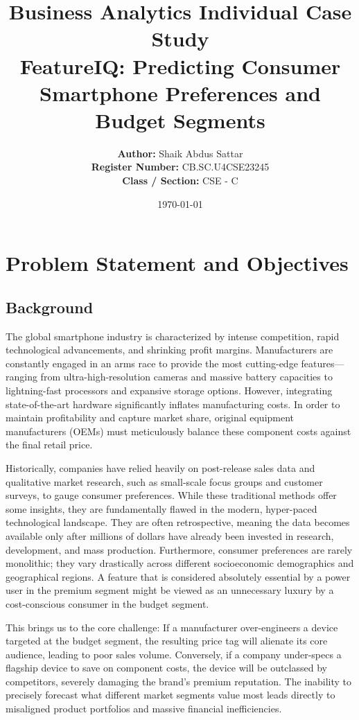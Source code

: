 \documentclass[12pt,a4paper]{article}
\title{Business Analytics Individual Case Study\\
\vspace{1cm}
\Large \textbf{FeatureIQ: Predicting Consumer Smartphone Preferences and Budget Segments}\\
\vspace{1cm}
}
\author{
    \textbf{Author:} Shaik Abdus Sattar \\
    \textbf{Register Number:} CB.SC.U4CSE23245 \\
    \textbf{Class / Section:} CSE - C
}
\date{\today}
\begin{document}
\maketitle
\thispagestyle{empty}
\newpage

\tableofcontents
\newpage

\section{Problem Statement and Objectives}

\subsection{Background}
The global smartphone industry is characterized by intense competition, rapid technological advancements, and shrinking profit margins. Manufacturers are constantly engaged in an arms race to provide the most cutting-edge features—ranging from ultra-high-resolution cameras and massive battery capacities to lightning-fast processors and expansive storage options. However, integrating state-of-the-art hardware significantly inflates manufacturing costs. In order to maintain profitability and capture market share, original equipment manufacturers (OEMs) must meticulously balance these component costs against the final retail price. 

Historically, companies have relied heavily on post-release sales data and qualitative market research, such as small-scale focus groups and customer surveys, to gauge consumer preferences. While these traditional methods offer some insights, they are fundamentally flawed in the modern, hyper-paced technological landscape. They are often retrospective, meaning the data becomes available only after millions of dollars have already been invested in research, development, and mass production. Furthermore, consumer preferences are rarely monolithic; they vary drastically across different socioeconomic demographics and geographical regions. A feature that is considered absolutely essential by a power user in the premium segment might be viewed as an unnecessary luxury by a cost-conscious consumer in the budget segment. 

This brings us to the core challenge: If a manufacturer over-engineers a device targeted at the budget segment, the resulting price tag will alienate its core audience, leading to poor sales volume. Conversely, if a company under-specs a flagship device to save on component costs, the device will be outclassed by competitors, severely damaging the brand's premium reputation. The inability to precisely forecast what different market segments value most leads directly to misaligned product portfolios and massive financial inefficiencies.
\end{document}
